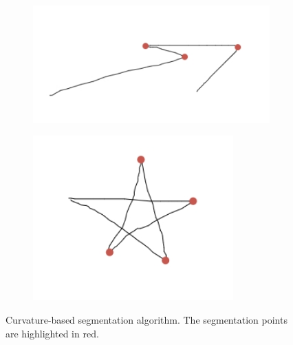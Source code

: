 \begin{figure}
	\centering
	\begin{subfigure}{0.45\textwidth}
		\centering
		\includegraphics[scale=0.4]{./img/seg_results_arrow.jpg}
		\caption{}
		\label{fig:seg_results_arrow}
	\end{subfigure}
	\begin{subfigure}{0.45\textwidth}
		\centering
		\includegraphics[scale=0.6]{./img/seg_results_pentagram.jpg}
		\caption{}
		\label{fig:seg_results_pentagram}
	\end{subfigure}
	\caption{Curvature-based segmentation algorithm. The segmentation points are highlighted in red.}
	\label{fig:seg_results}
\end{figure}

